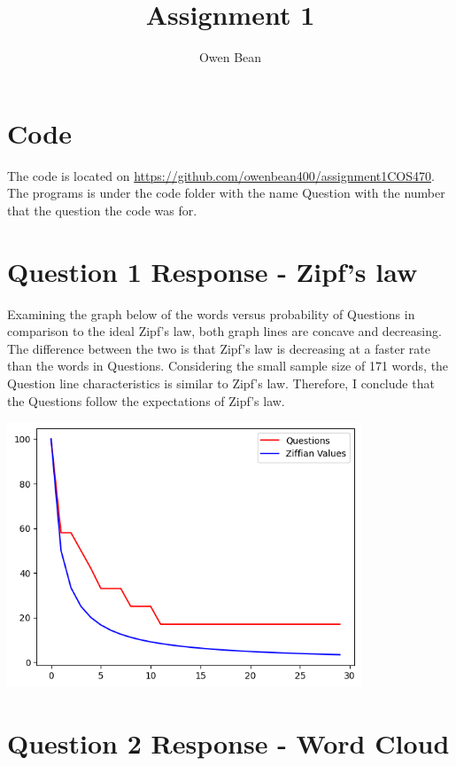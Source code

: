 \documentclass{article}
\title{Assignment 1}
\author{Owen Bean}
\begin{document}
\maketitle

\section{Code}

The code is located on \href{https://github.com/owenbean400/assignment1COS470}{https://github.com/owenbean400/assignment1COS470}. The programs is under the code folder with the name Question with the number that the question the code was for.

\section{Question 1 Response - Zipf's law}

Examining the graph below of the words versus probability of Questions in comparison to the ideal Zipf's law, both graph lines are concave and decreasing. The difference between the two is that Zipf's law is decreasing at a faster rate than the words in Questions. Considering the small sample size of 171 words, the Question line characteristics is similar to Zipf's law. Therefore, I conclude that the Questions follow the expectations of Zipf's law.

\includegraphics[width=400]{images/zipf.png}

\section{Question 2 Response - Word Cloud}
\end{document}
